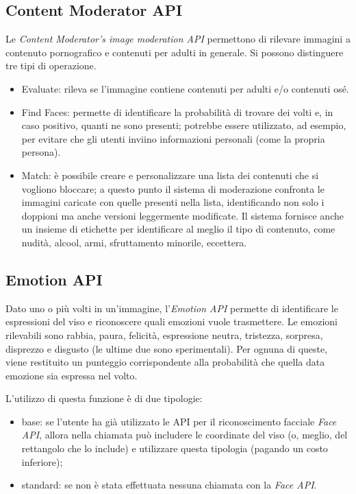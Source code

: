\subsection{Content Moderator API}
Le \textit{Content Moderator’s image moderation API} \cite{microsoft-api-2} permettono di rilevare immagini a contenuto pornografico e contenuti per adulti in generale.
Si possono distinguere tre tipi di operazione.
\begin{itemize}
\item \textsf{Evaluate}: rileva se l'immagine contiene contenuti per adulti e/o contenuti osé.
\item \textsf{Find Faces}: permette di identificare la probabilità di trovare dei volti e, in caso positivo, quanti ne sono presenti; potrebbe essere utilizzato, ad esempio, per evitare che gli utenti inviino informazioni personali (come la propria persona).
\item \textsf{Match}: è possibile creare e personalizzare una lista dei contenuti che si vogliono bloccare; a questo punto il sistema di moderazione confronta le immagini caricate
con quelle presenti nella lista, identificando non solo i doppioni ma anche versioni leggermente modificate.
Il sistema fornisce anche un insieme di etichette per identificare al meglio il tipo di contenuto, come nudità, alcool, armi, sfruttamento minorile, eccettera.
\end{itemize}
%
%
\subsection{Emotion API}
Dato uno o più volti in un'immagine, l'\textit{Emotion API} \cite{microsoft-api-4} permette di identificare le espressioni del viso e riconoscere quali emozioni vuole trasmettere.
Le emozioni rilevabili sono rabbia, paura, felicità, espressione neutra, tristezza, sorpresa, disprezzo e disgusto (le ultime due sono sperimentali).
Per ognuna di queste, viene restituito un punteggio corrispondente alla probabilità che quella data emozione sia espressa nel volto.

L'utilizzo di questa funzione è di due tipologie:
\begin{itemize}
\item base: se l'utente ha già utilizzato le API per il riconoscimento facciale \textit{Face API}, allora nella chiamata può includere le coordinate del viso
(o, meglio, del rettangolo che lo include) e utilizzare questa tipologia (pagando un costo inferiore);
\item standard: se non è stata effettuata nessuna chiamata con la \textit{Face API}.
\end{itemize}
%
